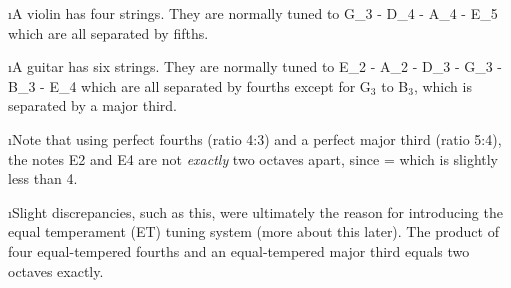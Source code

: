\i A violin has four strings.  
They are normally tuned to
\be
{\rm G_3 - D_4 - A_4 - E_5}
\ee
which are all separated by fifths.

\i A guitar has six strings.
They are normally tuned to
\be
{\rm E_2 - A_2 - D_3 - G_3 - B_3 - E_4}
\ee
which are all separated by fourths 
except for G$_3$ to B$_3$, which is separated by a 
major third.

\i Note that using perfect fourths (ratio 4:3) and
a perfect major third (ratio 5:4), the notes E2 and
E4 are not {\em exactly} two octaves apart, since
%
\be
{}\cdot
{}\cdot
{}\cdot
{}\cdot
{}
= 
\ee
%
which is slightly less than 4.

\i Slight discrepancies, such as this, were ultimately 
the reason for introducing the equal temperament (ET) tuning 
system (more about this later). 
The product of four equal-tempered fourths and an 
equal-tempered major third equals two octaves exactly.

\ei
